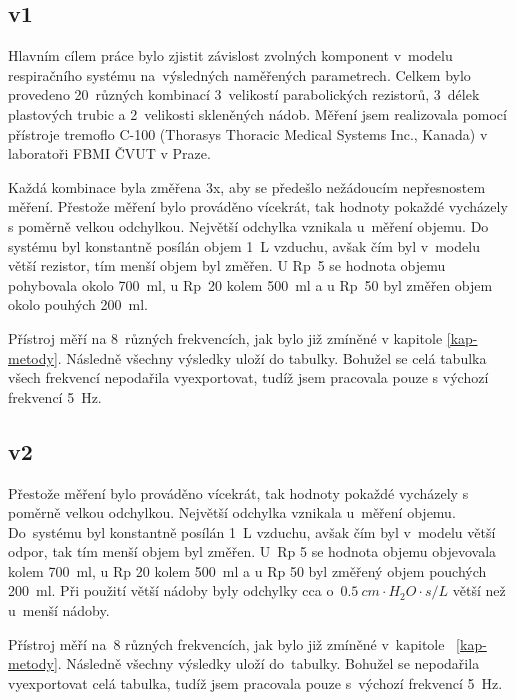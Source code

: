 \subsection{v1}
Hlavním cílem práce bylo zjistit závislost zvolných komponent v~modelu respiračního systému na~výsledných naměřených parametrech.  Celkem bylo provedeno 20~různých kombinací 3~velikostí parabolických rezistorů, 3~délek plastových trubic a 2~velikosti skleněných nádob. Měření jsem realizovala pomocí přístroje tremoflo C-100 (Thorasys Thoracic Medical Systems Inc., Kanada) v laboratoři FBMI ČVUT v Praze. 

Každá kombinace byla změřena 3x, aby se předešlo nežádoucím nepřesnostem měření. Přestože měření bylo prováděno vícekrát, tak hodnoty pokaždé vycházely s poměrně velkou odchylkou. Největší odchylka vznikala u~měření objemu. Do systému byl konstantně posílán objem \SI{1}{L} vzduchu, avšak čím byl v~modelu větší rezistor,  tím menší objem byl změřen. U Rp~5 se hodnota objemu pohybovala okolo  \SI{700}{ml}, u Rp~20 kolem  \SI{500}{ml} a u Rp~50 byl změřen objem okolo pouhých \SI{200}{ml}.

Přístroj měří na 8~různých frekvencích, jak bylo již zmíněné v kapitole \ref{kap-metody}. Následně všechny výsledky uloží do tabulky. Bohužel se  celá tabulka všech frekvencí nepodařila vyexportovat, tudíž jsem pracovala pouze s výchozí frekvencí  \SI{5}{Hz}. 

\subsection{v2}
Přestože měření bylo prováděno vícekrát, tak hodnoty pokaždé vycházely s poměrně velkou odchylkou. Největší odchylka vznikala u~měření objemu. Do~systému byl konstantně posílán \SI{1}{L} vzduchu, avšak čím byl v~modelu větší odpor, tak tím menší objem byl změřen. U~Rp 5 se hodnota objemu objevovala kolem \SI{700}{ml}, u Rp 20 kolem \SI{500}{ml} a u Rp 50 byl změřený objem pouchých \SI{200}{ml}. Při použití větší nádoby byly odchylky cca o~$\SI{0,5}{ cm\cdot H_{2}O \cdot s/L} $ větší než u~menší nádoby. 

Přístroj měří na~8 různých frekvencích, jak bylo již zmíněné v~kapitole~ \ref{kap-metody}. Následně všechny výsledky uloží do~tabulky. Bohužel se nepodařila vyexportovat celá tabulka, tudíž jsem pracovala pouze s~výchozí frekvencí  \SI{5}{Hz}. 

